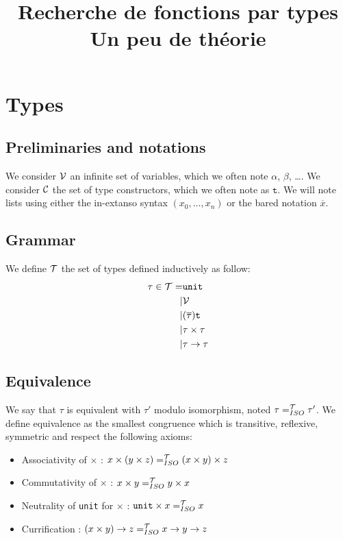 \documentclass [a4paper,11pt]{scrartcl}
\title{
  Recherche de fonctions par types \\[0.5em]
  \large Un peu de théorie
}
\date{}
\newcommand{\Var}{{\cal V}}
\newcommand{\Constr}{{\cal C}}
\newcommand{\tconstr}{\texttt{t}}
\newcommand{\T}{{\cal T}}
\newcommand\tprod{\times}
\newcommand\tlist{\overline}
\begin{document}
\maketitle


\section{Types}

\subsection{Preliminaries and notations}

We consider $\Var$ an infinite set of variables, which we often note $\alpha$, $\beta$, \dots.
We consider $\Constr$ the set of type constructors, which we often note as $\tconstr$.
We will note lists using either the in-extanso syntax $(x_0,\dots,x_n)$ or the
bared notation $\tlist{x}$.


\subsection{Grammar}

We define $\T$ the set of types defined inductively
as follow:
\begin{align*}
  \tau \in \T
  =& \texttt{unit}\\
  |& \Var\\
  |& (\tlist\tau) \tconstr\\
  |& \tau \tprod \tau\\
  |& \tau \to \tau
\end{align*}

\subsection{Equivalence}

\newcommand\eqT{=^{\T}_{ISO}}

We say that $\tau$ is equivalent with $\tau'$ modulo isomorphism,
noted $\tau \eqT \tau'$. We define
equivalence as the smallest congruence which is transitive, reflexive, symmetric and respect the following axioms:

\begin{itemize}
\item Associativity of $\tprod$ : $x \tprod (y \tprod z) \eqT (x \tprod y) \tprod z$
\item Commutativity of $\tprod$ : $x \tprod y \eqT y \tprod x$
\item Neutrality of \texttt{unit} for $\tprod$ : $\texttt{unit} \tprod x \eqT x$
\item Currification : $(x \tprod y) \to z \eqT x \to y \to z$
\end{itemize}
\end{document}
